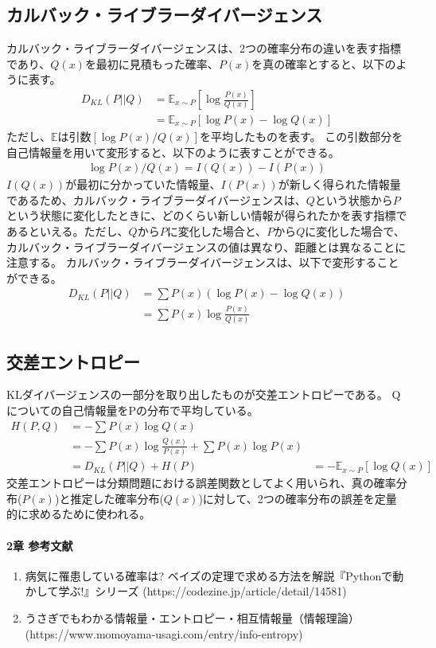 \documentclass{ltjsarticle}
\begin{document}
\newpage

\subsection{カルバック・ライブラーダイバージェンス}
カルバック・ライブラーダイバージェンスは、2つの確率分布の違いを表す指標であり、$Q(x)$を最初に見積もった確率、$P(x)$を真の確率とすると、以下のように表す。
\begin{align}
  D_{KL}(P||Q) &= \mathbb{E}_{x \sim P} [ \log \frac{P(x)}{Q(x)}] \\
  &= \mathbb{E}_{x \sim P} [\log P(x) - \log Q(x)] 
\end{align}
ただし、$\mathbb{E}$は引数$[\log P(x)/Q(x)]$を平均したものを表す。
この引数部分を自己情報量を用いて変形すると、以下のように表すことができる。
\begin{align}
  \log P(x)/Q(x) = I(Q(x)) - I(P(x))
\end{align}
$I(Q(x))$が最初に分かっていた情報量、$I(P(x))$が新しく得られた情報量であるため、カルバック・ライブラーダイバージェンスは、$Q$という状態から$P$という状態に変化したときに、どのくらい新しい情報が得られたかを表す指標であるといえる。ただし、$Q$から$P$に変化した場合と、$P$から$Q$に変化した場合で、カルバック・ライブラーダイバージェンスの値は異なり、距離とは異なることに注意する。
カルバック・ライブラーダイバージェンスは、以下で変形することができる。
\begin{align}
  D_{KL}(P||Q) &= \sum P(x)(\log P(x) -\log Q(x)) \\
&= \sum P(x) \log \frac{P(x)}{Q(x)}
\end{align}



\newpage

\subsection{交差エントロピー}
KLダイバージェンスの一部分を取り出したものが交差エントロピーである。
Qについての自己情報量をPの分布で平均している。
\begin{align}
  H(P, Q) &= - \sum P(x) \log Q(x) \\
  &= - \sum P(x) \log \frac{Q(x)}{P(x)} + \sum P(x) \log P(x) \\
  &= D_{KL}(P||Q) + H(P)
  &= - \mathbb{E}_{x \sim P} [\log Q(x)]
\end{align}
交差エントロピーは分類問題における誤差関数としてよく用いられ、真の確率分布($P(x)$)と推定した確率分布($Q(x)$)に対して、2つの確率分布の誤差を定量的に求めるために使われる。


\paragraph{2章 参考文献}
\begin{enumerate}
  \item 病気に罹患している確率は? ベイズの定理で求める方法を解説『Pythonで動かして学ぶ!』シリーズ (https://codezine.jp/article/detail/14581)
  \item うさぎでもわかる情報量・エントロピー・相互情報量（情報理論）(https://www.momoyama-usagi.com/entry/info-entropy)
\end{enumerate}

\newpage
\end{document}
